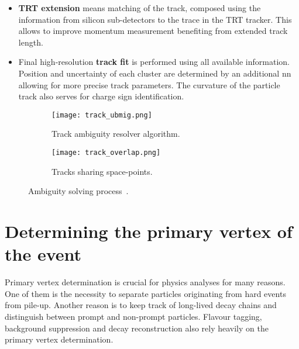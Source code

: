 \begin{itemize}
  		The tracks are ordered by their track score and consequently fed to the ambiguity resolving sequence. A track must pass a number of kinematic cuts, impact parameters cuts, number of holes, number of clusters and shared clusters cuts, otherwise the track candidate is rejected. If a track candidate has no shared clusters with other candidates it is accepted after that. If there are merged clusters then it is up to the \gls{nn} to either accept the track, reject it or eliminate a space-point and recycle the updated track candidate (see Fig. \ref{fig::tr_ambig}). 
  		\item \textbf{TRT extension} means matching of the track, composed using the information from silicon sub-detectors to the trace in the TRT tracker. This allows to improve momentum measurement benefiting from extended track length.
  		\item Final high-resolution \textbf{track fit} is performed using all available information. Position and uncertainty of each cluster are determined by an additional \gls{nn} allowing for more precise track parameters. The curvature of the particle track also serves for charge sign identification.
  	\end{itemize}
  		\begin{figure}[htbp]
  		\begin{subfigure}[t]{0.65\textwidth}
  			\texttt{[image: track\_ubmig.png]}
  			\caption[Side view]{Track ambiguity resolver algorithm.}
  			\label{fig::tr_ambig}
  		\end{subfigure}
  		\hfill
  		\begin{subfigure}[t]{0.33\textwidth} 
  			\texttt{[image: track\_overlap.png]}
  			\caption[Tracks sharing space-points]{Tracks sharing space-points.}
  			\label{fig::tr_overlap}
  		\end{subfigure}
  		\caption{Ambiguity solving process~\cite{ATLAS:track2}.}
  		\label{fig::tr_resol}
  	\end{figure}
  \section{Determining the primary vertex of the event}
   Primary vertex determination is crucial for physics analyses for many  reasons. One of them is the necessity to separate particles originating from hard events from pile-up. Another reason is to keep track of long-lived decay chains and distinguish between prompt and non-prompt particles. Flavour tagging, background suppression and decay reconstruction also rely heavily on the primary vertex determination.
   
